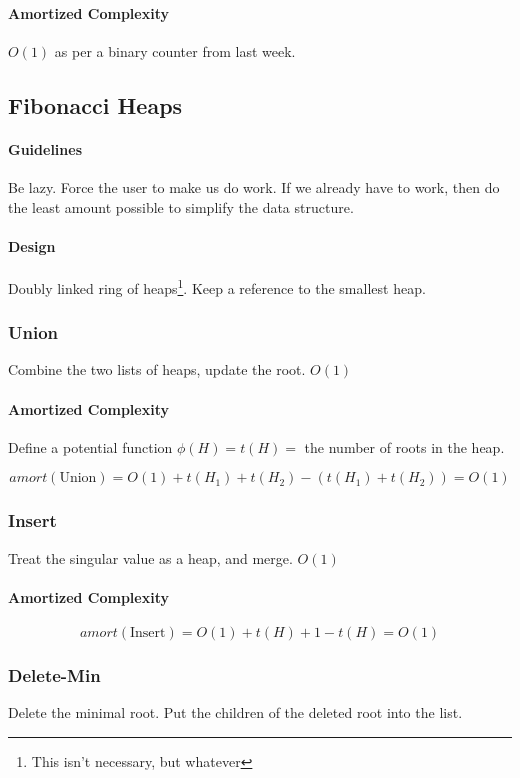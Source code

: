 \documentclass[a4paper]{article}
\begin{document}
\paragraph{Amortized Complexity}
$O(1)$ as per a binary counter from last week.

\subsection{Fibonacci Heaps}

\paragraph{Guidelines}
Be lazy. Force the user to make us do work. If we already have to work, then do the least amount possible to simplify the data structure.

\paragraph{Design}
Doubly linked ring of heaps\footnote{This isn't necessary, but whatever}. Keep a reference to the smallest heap.

\subsubsection{Union}
Combine the two lists of heaps, update the root. $O(1)$

\paragraph{Amortized Complexity}
Define a potential function $\phi(H)=t(H)=$ the number of roots in the heap.

\[amort(\text{Union})=O(1)+t(H_1)+t(H_2)-(t(H_1)+t(H_2))=O(1)\]

\subsubsection{Insert}
Treat the singular value as a heap, and merge. $O(1)$

\paragraph{Amortized Complexity}
\[amort(\text{Insert})=O(1)+t(H)+1-t(H)=O(1)\]

\subsubsection{Delete-Min}
Delete the minimal root. Put the children of the deleted root into the list.
\end{document}
